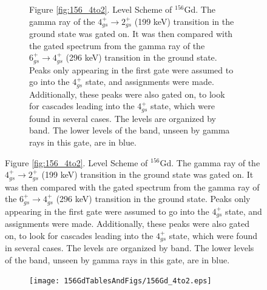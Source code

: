 \begin{landscape}
\begin{figure}[!]
    \centering
    \label{fig:156_4to2}
    \begin{subfigure}{1.4\textwidth}
    \caption*{\centering \fontsize{10pt}{12pt}Figure \ref{fig:156_4to2}. Level Scheme of $^{156}$Gd. The gamma ray of the $4^+_{gs}\rightarrow 2^+_{gs}$ (199 keV) transition in the ground state was gated on. It was then compared with the gated spectrum from the gamma ray of the $6^+_{gs}\rightarrow 4^+_{gs}$ (296 keV) transition in the ground state. Peaks only appearing in the first gate were assumed to go into the $4^+_{gs}$ state, and assignments were made. Additionally, these peaks were also gated on, to look for cascades leading into the $4^+_{gs}$ state, which were found in several cases. The levels are organized by band. The lower levels of the band, unseen by gamma rays in this gate, are in blue.}
    \end{subfigure}
\end{figure}
\clearpage
\begin{figure}
    \ContinuedFloat
    \begin{subfigure}{1.4\textwidth}
    \texttt{[image: 156GdTablesAndFigs/156Gd\_4to2.eps]}
    \label{fig:156_4to2level}
    \end{subfigure}
\end{figure}
\end{landscape}
